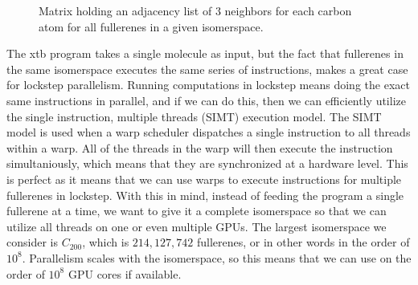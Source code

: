 \begin{figure}[H]
\begin{minipage}{.45\textwidth}
  \caption{Matrix holding an adjacency list of $3$ neighbors for each carbon atom for all fullerenes in a given isomerspace.}
  \label{fig:isomerspace_atom_neighbors}
\end{minipage}
\end{figure}


The xtb program takes a single molecule as input, but the fact that fullerenes in the same isomerspace executes the same series of instructions, makes a great case for lockstep parallelism. Running computations in lockstep means doing the exact same instructions in parallel, and if we can do this, then we can efficiently utilize the single instruction, multiple threads (SIMT) execution model. The SIMT model is used when a warp scheduler dispatches a single instruction to all threads within a warp. All of the threads in the warp will then execute the instruction simultaniously, which means that they are synchronized at a hardware level. This is perfect as it means that we can use warps to execute instructions for multiple fullerenes in lockstep. With this in mind, instead of feeding the program a single fullerene at a time, we want to give it a complete isomerspace so that we can utilize all threads on one or even multiple GPUs. The largest isomerspace we consider is $C_{200}$, which is $214,127,742$ fullerenes, or in other words in the order of $10^8$. Parallelism scales with the isomerspace, so this means that we can use on the order of $10^8$ GPU cores if available.

